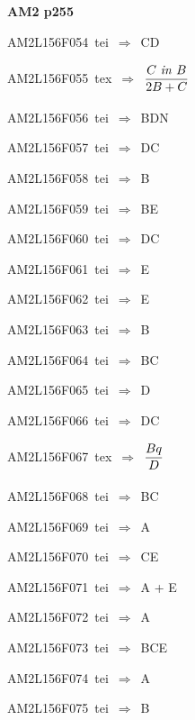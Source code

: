 \par\vfill\eject
{\bf\hfill AM2 p255\hfill\hbox{}}\par\bigskip
{\sixrm AM2L156F054\ {\sixit tei}\ }$\Rightarrow$\ CD\par\smallskip
{\sixrm AM2L156F055\ {\sixit tex}\ }$\Rightarrow$\ ${\displaystyle\strut {C \ {\it in}\  B}\over \displaystyle\strut {2B + C}}$\par\smallskip
{\sixrm AM2L156F056\ {\sixit tei}\ }$\Rightarrow$\ BDN\par\smallskip
{\sixrm AM2L156F057\ {\sixit tei}\ }$\Rightarrow$\ DC\par\smallskip
{\sixrm AM2L156F058\ {\sixit tei}\ }$\Rightarrow$\ B\par\smallskip
{\sixrm AM2L156F059\ {\sixit tei}\ }$\Rightarrow$\ BE\par\smallskip
{\sixrm AM2L156F060\ {\sixit tei}\ }$\Rightarrow$\ DC\par\smallskip
{\sixrm AM2L156F061\ {\sixit tei}\ }$\Rightarrow$\ E\par\smallskip
{\sixrm AM2L156F062\ {\sixit tei}\ }$\Rightarrow$\ E\par\smallskip
{\sixrm AM2L156F063\ {\sixit tei}\ }$\Rightarrow$\ {\tenit B}\par\smallskip
{\sixrm AM2L156F064\ {\sixit tei}\ }$\Rightarrow$\ BC\par\smallskip
{\sixrm AM2L156F065\ {\sixit tei}\ }$\Rightarrow$\ {\tenit D}\par\smallskip
{\sixrm AM2L156F066\ {\sixit tei}\ }$\Rightarrow$\ DC\par\smallskip
{\sixrm AM2L156F067\ {\sixit tex}\ }$\Rightarrow$\ ${\displaystyle\strut Bq\over \displaystyle\strut D}$\par\smallskip
{\sixrm AM2L156F068\ {\sixit tei}\ }$\Rightarrow$\ BC\par\smallskip
{\sixrm AM2L156F069\ {\sixit tei}\ }$\Rightarrow$\ {\tenit A}\par\smallskip
{\sixrm AM2L156F070\ {\sixit tei}\ }$\Rightarrow$\ CE\par\smallskip
{\sixrm AM2L156F071\ {\sixit tei}\ }$\Rightarrow$\ {\tenit A} + {\tenit E}\par\smallskip
{\sixrm AM2L156F072\ {\sixit tei}\ }$\Rightarrow$\ A\par\smallskip
{\sixrm AM2L156F073\ {\sixit tei}\ }$\Rightarrow$\ BCE\par\smallskip
{\sixrm AM2L156F074\ {\sixit tei}\ }$\Rightarrow$\ {\tenit A}\par\smallskip
{\sixrm AM2L156F075\ {\sixit tei}\ }$\Rightarrow$\ {\tenit B}\par\smallskip
